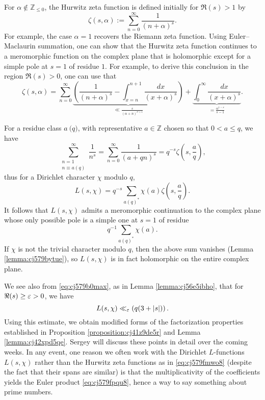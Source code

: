 \documentclass[reqno]{amsart}  \numberwithin{theorem}{section} \numberwithin{equation}{section}
\begin{document}
For $\alpha \notin \mathbb{Z}_{\leq 0}$, the Hurwitz zeta function is defined initially for $\Re(s) > 1$ by
\begin{equation*}
\zeta (s,\alpha) := \sum_{n = 0 }^\infty \frac{1}{(n + \alpha  )^s }.
\end{equation*}
For example, the case $\alpha = 1$ recovers the Riemann zeta function.  Using Euler--Maclaurin summation, one can show that the Hurwitz zeta function continues to a meromorphic function on the complex plane that is holomorphic except for a simple pole at $s = 1$ of residue $1$.  For example, to derive this conclusion in the region $\Re(s) > 0$, one can use that
\begin{equation*}
  \zeta(s,\alpha) = \sum_{n = 0 }^\infty 
    \underbrace
    {
      \left(
        \frac{1}{(n + \alpha )^s } - \int_{x = n}^{n + 1} \frac{d x}{(x + \alpha )^s }
          \right)
}_{
 \ll \frac{s}{(\alpha + n)^{\sigma+1}} 
}
  +
  \underbrace
{
\int_0^\infty \frac{d x}{(x + \alpha)^s }
}_{
= \frac{\alpha^{1 - s }}{ s - 1}
}.
\end{equation*}


For a residue class $a \pod{q}$, with representative $a \in \mathbb{Z}$ chosen so that $0 < a \leq q$, we have
\begin{equation}\label{eq:cj579fmwo8}
  \sum_{
    \substack{
      n = 1  \\
       n \equiv a(q)
    }
  }^\infty \frac{1}{ n^s }
  =
  \sum_{n = 0 }^\infty \frac{1}{(a + q n)^s }
  =
  q^{- s} \zeta\left(s, \frac{a}{q}\right),
\end{equation}
thus for a Dirichlet character $\chi$ modulo $q$,
\begin{equation}\label{eq:cj579b0max}
L(s,\chi) = q^{- s} \sum_{a(q)^*} \chi (a) \zeta \left( s, \frac{a}{q} \right).
\end{equation}
It follows that $L (s, \chi)$ admits a meromorphic continuation to the complex plane whose only possible pole is a simple one at $s= 1$ of residue
\begin{equation*}
q^{- 1} \sum_{a (q) ^*} \chi (a).
\end{equation*}
If $\chi$ is not the trivial character modulo $q$, then the above sum vanishes (Lemma \ref{lemma:cj579bytue}), so $L(s, \chi)$ is in fact holomorphic on the entire complex plane.


We see also from \eqref{eq:cj579b0max}, as in Lemma \ref{lemma:cj56e5ibho}, that for $\Re(s) \geq \varepsilon > 0$, we have
\begin{equation*}
  L (s, \chi ) \ll_{\varepsilon} \left( q (3 + \lvert s \rvert) \right).
\end{equation*}
Using this estimate, we obtain modified forms of the factorization properties established in Proposition \ref{proposition:cj41z9de5r} and Lemma \ref{lemma:cj42xpd5qe}.  Sergey will discuss these points in detail over the coming weeks.  In any event, one reason we often work with the Dirichlet $L$-functions $L(s,\chi)$ rather than the Hurwitz zeta functions as in \eqref{eq:cj579fmwo8} (despite the fact that their spans are similar) is that the multiplicativity of the coefficients yields the Euler product \eqref{eq:cj579fpqu8}, hence a way to say something about prime numbers.
\end{document}
